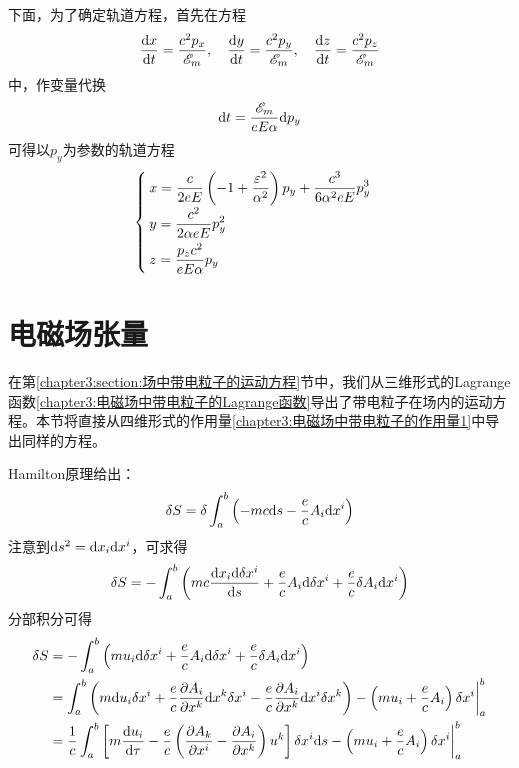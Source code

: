 \begin{solution}
下面，为了确定轨道方程，首先在方程
\begin{equation}
	\frac{\mathrm{d} x}{\mathrm{d} t} = \frac{c^2p_x}{\mathscr{E}_m},\quad \frac{\mathrm{d} y}{\mathrm{d} t} = \frac{c^2p_y}{\mathscr{E}_m},\quad \frac{\mathrm{d} z}{\mathrm{d} t} = \frac{c^2p_z}{\mathscr{E}_m}
\end{equation}
中，作变量代换
\begin{equation*}
	\mathrm{d} t = \frac{\mathscr{E}_m}{eE\alpha}\mathrm{d} p_y
\end{equation*}
可得以$p_y$为参数的轨道方程
\begin{equation}
\begin{cases}
	\displaystyle x = \frac{c}{2eE}\left(-1+\frac{\varepsilon^2}{\alpha^2}\right)p_y + \frac{c^3}{6\alpha^2eE}p_y^3 \\[1.5ex]
	\displaystyle y = \frac{c^2}{2\alpha eE}p_y^2 \\[1.5ex]
	\displaystyle z = \frac{p_zc^2}{eE\alpha}p_y
\end{cases}
\end{equation}
\end{solution}

\section{电磁场张量}

在第\ref{chapter3:section:场中带电粒子的运动方程}节中，我们从三维形式的Lagrange函数\eqref{chapter3:电磁场中带电粒子的Lagrange函数}导出了带电粒子在场内的运动方程。本节将直接从四维形式的作用量\eqref{chapter3:电磁场中带电粒子的作用量1}中导出同样的方程。

Hamilton原理给出：
\begin{equation}
	\delta S = \delta \int_a^b \left(-mc\mathrm{d} s-\frac{e}{c}A_i\mathrm{d} x^i\right)
	\label{chapter3:电磁场张量-电磁场的Hamilton原理1}
\end{equation}
注意到$\mathrm{d} s^2 = \mathrm{d} x_i\mathrm{d} x^i$，可求得
\begin{equation*}
	\delta S = -\int_a^b \left(mc\frac{\mathrm{d} x_i\mathrm{d} \delta x^i}{\mathrm{d} s} + \frac{e}{c}A_i\mathrm{d} \delta x^i + \frac{e}{c}\delta A_i\mathrm{d} x^i\right)
\end{equation*}
分部积分可得
\begin{align}
	\delta S & = -\int_a^b \left(mu_i\mathrm{d} \delta x^i + \frac{e}{c}A_i\mathrm{d} \delta x^i + \frac{e}{c}\delta A_i\mathrm{d} x^i\right) \nonumber \\
	& = \int_a^b \left(m\mathrm{d} u_i \delta x^i + \frac{e}{c}\frac{\partial A_i}{\partial x^k}\mathrm{d} x^k\delta x^i - \frac{e}{c} \frac{\partial A_i}{\partial x^k}\mathrm{d} x^i \delta x^k\right) - \left(mu_i+\frac{e}{c}A_i\right)\delta x^i\bigg|_a^b \nonumber \\
	& = \frac1c \int_a^b \left[m\frac{\mathrm{d} u_i}{\mathrm{d} \tau} - \frac{e}{c}\left(\frac{\partial A_k}{\partial x^i} - \frac{\partial A_i}{\partial x^k}\right) u^k\right] \delta x^i\mathrm{d} s - \left(mu_i+\frac{e}{c}A_i\right)\delta x^i\bigg|_a^b
	\label{chapter3:电磁场张量-电磁场的Hamilton原理2}
\end{align}

